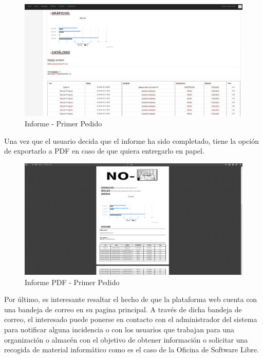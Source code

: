 \documentclass[a4paper,11pt]{book}
\begin{document}
\begin{figure}[H] 
\centering 
\includegraphics[scale=0.25]{imagenes/pruebas/informe_2.png}
\caption{ Informe - Primer Pedido\cite{propio}}
\end{figure}

Una vez que el usuario decida que el informe ha sido completado, tiene la opción de exportarlo a PDF en caso de que quiera entregarlo en papel.
\begin{figure}[H] 
\centering 
\includegraphics[scale=0.25]{imagenes/pruebas/informe_pdf.png}
\caption{ Informe PDF - Primer Pedido\cite{propio}}
\end{figure}

Por último, es interesante resaltar el hecho de que la plataforma web cuenta con una bandeja de correo en su pagina principal. A través de dicha bandeja de correo, el interesado puede ponerse en contacto con el administrador del sistema para notificar alguna incidencia o con los usuarios que trabajan para una organización o  almacén con el objetivo de obtener información o solicitar una recogida de material informático como es el caso de la Oficina de Software Libre.  
 
\end{document}
